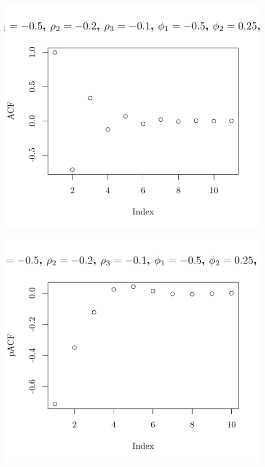 \documentclass[10pt]{paper}\usepackage[]{graphicx}\usepackage[]{color}
\makeatletter
\def\maxwidth{ %
  \ifdim\Gin@nat@width>\linewidth
    \linewidth
  \else
    \Gin@nat@width
  \fi
}
\newenvironment{knitrout}{}{} %
\makeatother
\begin{document}
\begin{knitrout}
{\centering \includegraphics[width=\maxwidth]{figure/graphics-plotter-147} 

}




{\centering \includegraphics[width=\maxwidth]{figure/graphics-plotter-148} 

}





\end{knitrout}
\end{document}
